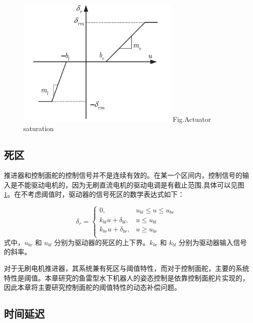\begin{figure}[!htp]
\centering
 \includegraphics[width=8cm]{figure/chap6/sat.png}
 \label{fig:chap6:F1}
  {Fig.}{Actuator saturation}
\end{figure}

\subsection{死区 }

推进器和控制面舵的控制信号并不是连续有效的。在某一个区间内，控制信号的输入是不能驱动电机的，因为无刷直流电机的驱动电调是有截止范围,具体可以见图\ref{fig:chap6:F1}。在不考虑阈值时，驱动器的信号死区的数学表达式如下：

\begin{equation}
\label{eq:chap6:sat}
\delta_{r} = \left\{
\begin{matrix}
0  ,&  u_{bl} \leq u \leq u_{br}  \\
k_{bl}u + \delta_{bl} ,&   u \leq u_{bl} \\
k_{br}u + \delta_{br} ,&   u \geq u_{br} \\
\end{matrix}\right.
\end{equation}
式中，$u_{br}$ 和 $u_{bl}$ 分别为驱动器的死区的上下界。$k_{br}$ 和 $k_{bl}$ 分别为驱动器输入信号的斜率。

对于无刷电机推进器，其系统兼有死区与阈值特性，而对于控制面舵，主要的系统特性是阈值。本章研究的鱼雷型水下机器人的姿态控制是依靠控制面舵片实现的，因此本章将主要研究控制面舵的阈值特性的动态补偿问题。

\subsection{时间延迟 }

